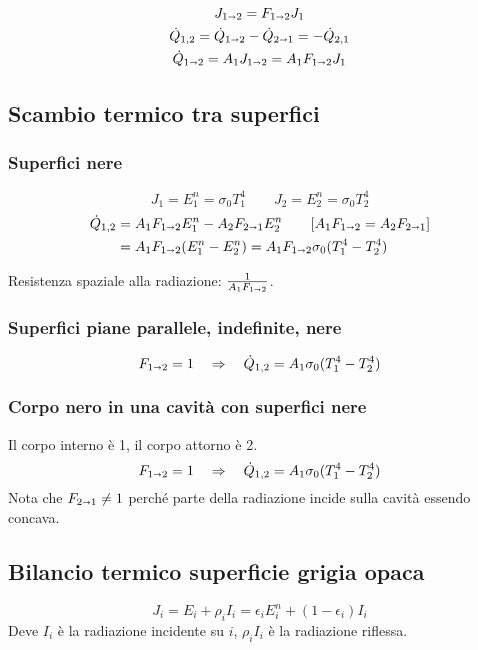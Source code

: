 \begin{equation*}
    \begin{gathered}
        J_{1\shortrightarrow 2} = F_{1\shortrightarrow 2}J_1 \\
        \dot{Q}_{1,2} = \dot{Q}_{1\shortrightarrow 2} - \dot{Q}_{2\shortrightarrow 1} = -\dot{Q}_{2,1} \\
        \dot{Q}_{1\shortrightarrow 2} = A_1J_{1\shortrightarrow 2} = A_1F_{1\shortrightarrow 2}J_1
    \end{gathered}
\end{equation*}

\subsection{Scambio termico tra superfici}

\subsubsection{Superfici nere}
\[
    J_1 = E^n_1 = \sigma_0T_1^4 \qquad J_2 = E^n_2 = \sigma_0T_2^4
\]
\begin{align*}
    \dot{Q}_{1,2} &= A_1F_{1\shortrightarrow 2}E_1^n - A_2F_{2\shortrightarrow 1}E_2^n \qquad [A_1F_{1\shortrightarrow 2} = A_2F_{2\shortrightarrow 1}] \\
        &= A_1F_{1\shortrightarrow 2} (E_1^n - E_2^n) = A_1F_{1\shortrightarrow 2}\sigma_0(T_1^4 - T_2^4)
\end{align*}

Resistenza spaziale alla radiazione: $\frac{1}{A_1F_{1\shortrightarrow 2}}$.

\subsubsection{Superfici piane parallele, indefinite, nere}
\[
    F_{1\shortrightarrow 2} = 1 \quad \Rightarrow \quad \dot{Q}_{1,2} = A_1\sigma_0(T_1^4 - T_2^4)
\]

\subsubsection{Corpo nero in una cavità con superfici nere}
Il corpo interno è 1, il corpo attorno è 2.
\[
    F_{1\shortrightarrow 2} = 1 \quad \Rightarrow \quad \dot{Q}_{1,2} = A_1\sigma_0(T_1^4 - T_2^4)
\]
Nota che $F_{2\shortrightarrow 1} \ne 1$ perché parte della radiazione incide sulla cavità essendo concava.

\subsection{Bilancio termico superficie grigia opaca}
\[
    J_i = E_i + \rho_iI_i = \epsilon_iE_i^n + (1-\epsilon_i)I_i
\]
Deve $I_i$ è la radiazione incidente su $i$, $\rho_i I_i$ è la radiazione riflessa.

